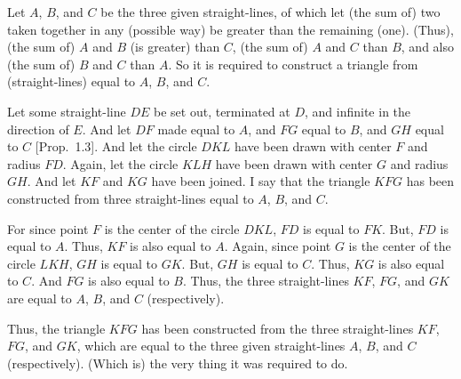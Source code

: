 \begin{Parallel}{}{}
{\epsfysize=2.3in
\centerline{}

Let $A$, $B$, and $C$ be the three given straight-lines, of which let (the sum of) two taken together in any (possible way)
be greater than the remaining (one). (Thus), (the sum of) $A$ and $B$ (is greater) than $C$, (the sum of) $A$ and $C$ than $B$,
and also (the sum of) $B$ and $C$ than $A$. So it is required to construct a triangle
from (straight-lines) equal to $A$, $B$, and $C$.

Let some straight-line $DE$ be set out, terminated at $D$, and infinite in the
direction of $E$.  And let $DF$ made equal to $A$, and $FG$
equal to $B$, and $GH$ equal to $C$ [Prop.~1.3]. And let the
circle $DKL$ have been drawn with center $F$ and radius $FD$. Again,
let the circle $KLH$ have been drawn with center $G$ and radius $GH$. And
let $KF$ and $KG$ have been joined. I say that the triangle $KFG$ has been
constructed from three straight-lines equal to $A$, $B$, and $C$.

For since point $F$ is the center of the circle $DKL$, $FD$ is equal to $FK$.
But, $FD$ is equal to $A$. Thus, $KF$ is also equal to $A$. Again, since point
$G$ is the center of the circle $LKH$, $GH$ is equal to $GK$. But, $GH$ is equal
to $C$. Thus, $KG$ is also equal to $C$. And $FG$ is also equal to $B$. Thus,
the three straight-lines $KF$, $FG$, and $GK$ are equal to $A$, $B$, and $C$ (respectively).

Thus, the triangle $KFG$ has been constructed from the three straight-lines
$KF$, $FG$, and $GK$, which are equal to the three given straight-lines
$A$, $B$, and $C$ (respectively). (Which is) the very thing it was required
to do.}
\end{Parallel}

